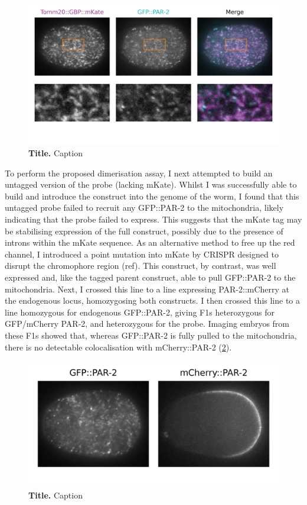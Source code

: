 \documentclass[12pt]{"article"}
\newcommand{\mycaption}[2]{\caption[#1]{\textbf{#1.} #2}}
\begin{document}
\begin{figure}[!h]
\includegraphics[scale=0.95]{tomm20_merge}
\setlength{\abovecaptionskip}{20pt}
\centering
\mycaption{Title}{Caption}
\label{fig:tomm20_merge}
\end{figure}

To perform the proposed dimerisation assay, I next attempted to build an untagged version of the probe (lacking mKate). Whilst I was successfully able to build and introduce the construct into the genome of the worm, I found that this untagged probe failed to recruit any GFP::PAR-2 to the mitochondria, likely indicating that the probe failed to express. This suggests that the mKate tag may be stabilising expression of the full construct, possibly due to the presence of introns within the mKate sequence. As an alternative method to free up the red channel, I introduced a point mutation into mKate by CRISPR designed to disrupt the chromophore region (ref). This construct, by contrast, was well expressed and, like the tagged parent construct, able to pull GFP::PAR-2 to the mitochondria. Next, I crossed this line to a line expressing PAR-2::mCherry at the endogenous locus, homozygosing both constructs. I then crossed this line to a line homozygous for endogenous GFP::PAR-2, giving F1s heterozygous for GFP/mCherry PAR-2, and heterozygous for the probe.  Imaging embryos from these F1s showed that, whereas GFP::PAR-2 is fully pulled to the mitochondria, there is no detectable colocalisation with mCherry::PAR-2 (\cref{fig:tomm20_assay}).\\

\begin{figure}[!h]
\includegraphics[scale=1]{tomm20_assay}
\setlength{\abovecaptionskip}{20pt}
\centering
\mycaption{Title}{Caption}
\label{fig:tomm20_assay}
\end{figure}
\end{document}
